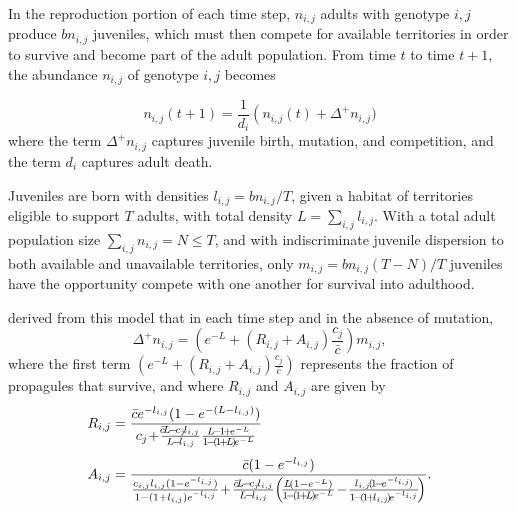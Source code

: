 \documentclass[9pt,twocolumn,twoside]{article}
\begin{document}
In the reproduction portion of each time step, $n_{i,j}$ adults with genotype ${i,j}$ produce $b n_{i,j}$ juveniles, which must then compete for available territories in order to survive and become part of the adult population. From time $t$ to time $t+1$, the abundance $n_{i,j}$ of genotype ${i,j}$ becomes

\begin{equation}
    \label{eq:CompleteTimeStep}
    n_{i,j} (t+1) = \frac{1}{d_{i}}\left(n_{i,j} (t)+\Delta^+{n_{i,j})}\right.
\end{equation}
where the term $\Delta^+ n_{i,j}$ captures juvenile birth, mutation, and competition, and the term $d_i$ captures adult death.

Juveniles are born with densities $l_{i,j} = b n_{i,j}/T$, given a habitat of territories eligible to support $T$ adults, with total density $L=\sum_{i,j} l_{i,j}$. With a total adult population size $\sum_{i,j} n_{i,j}=N \leq T$, and with indiscriminate juvenile dispersion to both available and unavailable territories, only $m_{i,j} = b n_{i,j} (T-N)/T$ juveniles have the opportunity compete with one another for survival into adulthood.

\citet{bertram2019density} derived from this model that in each time step and in the absence of mutation,
\begin{equation}\label{eq:BMlotNewAd}
    \Delta^+ n_{i,j} = (e^{-L} +(R_{i,j}+A_{i,j})\frac{c_{j}}{\bar{c}})m_{i,j}, 
\end{equation}
where the first term $(e^{-L} +(R_{i,j}+A_{i,j})\frac{c_{j}}{\bar{c}})$ represents the fraction of propagules that survive, and where $R_{i,j}$ and $A_{i,j}$ are given by
\begin{equation} \label{eq:BMlotCompTerms}
\begin{aligned}
R_{i,j} &= \frac{\bar{c}e^{-l_{i,j}}(1-e^{-(L-l_{i,j})})}{c_{j}\! +\!\frac{\!\bar{c}\!L\!-\!c_{j}\!l_{i,j}}{L\!-\!l_{i,j}}\frac{L\!-\!1\!+\!e^{-L}}{1\!-\!(\!1\!+\!L\!)\!e^{-L}}}\\[3pt]
A_{i,j} &= \frac{\bar{c}(1-e^{-l_{i,j}})}{ \footnotesize \frac{c_{i,j} l_{i,j}(1-e^{-l_{i,j}})}{1-(1+l_{i,j})e^{-l_{i,j}}}\!+\!\frac{\bar{c}\!L\!-\!c_{j}\!l_{i,j}}{L\!-\!l_{i,j}}\!\left(\!\frac{L\!(1-e^{-L})}{1\!-\!(\!1\!+\!L\!)\!e^{-L}}\!-\!\frac{l_{i,j}\!(\!1\!-\!e^{-l_{i,j}}\!)}{1\!-\!(\!1\!+\!l_{i,j}\!)\!e^{-l_{i,j}}}\!\right)}.\\
\end{aligned}
\end{equation}
\
\end{document}
